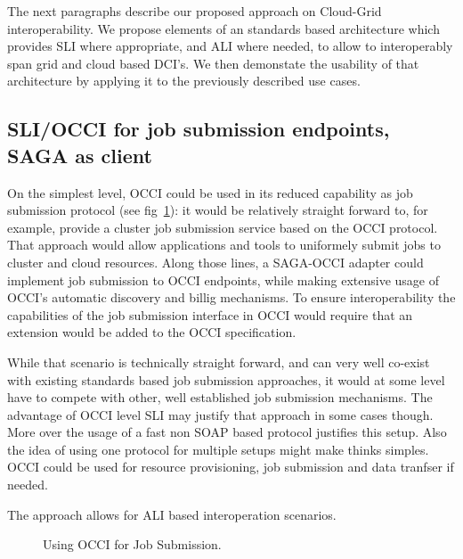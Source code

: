 \documentclass[10pt,conference,final,letterpaper,twoside,twocolumn,]{IEEEtran}
\begin{document}
 The next paragraphs describe our proposed approach on Cloud-Grid
 interoperability.  We propose elements of an standards based
 architecture which provides  SLI where appropriate, and ALI where
 needed, to allow to interoperably span grid and cloud based DCI's.
 We then demonstate the usability of that architecture by applying it
 to the previously described use cases.


 \subsection{SLI/OCCI for job submission endpoints, SAGA as client}

 On the simplest level, OCCI could be used in its reduced capability
 as job submission protocol (see fig~\ref{fig:arch1}): it would be
 relatively straight forward to, for example, provide a cluster job
 submission service based on the OCCI protocol. That approach would
 allow applications and tools to uniformely submit jobs to cluster and
 cloud resources.  Along those lines, a SAGA-OCCI adapter could
 implement job submission to OCCI endpoints, while making extensive
 usage of OCCI's automatic discovery and billig mechanisms. To ensure
 interoperability the capabilities of the job submission interface in
 OCCI would require that an extension would be added to the OCCI
 specification.

 While that scenario is technically straight forward, and can very
 well co-exist with existing standards based job submission
 approaches, it would at some level have to compete with other, well
 established job submission mechanisms.  The advantage of OCCI level
 SLI may justify that approach in some cases though. More over the
 usage of a fast non SOAP based protocol justifies this setup. Also
 the idea of using one protocol for multiple setups might make thinks
 simples. OCCI could be used for resource provisioning, job submission
 and data tranfser if needed.

 The approach allows for ALI based interoperation scenarios.

\begin{figure}[htb]
 \caption{\label{fig:arch1} Using OCCI for Job Submission.}
\end{figure}
\end{document}
